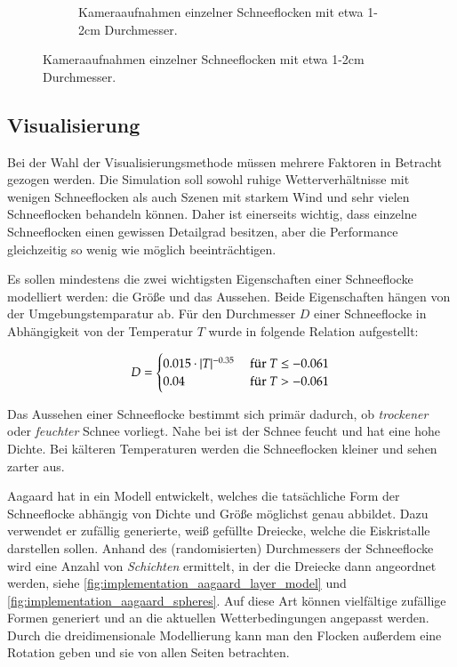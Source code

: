 \begin{figure}
\begin{subfigure}[b]{0.5\textwidth}
            \caption{Kameraaufnahmen einzelner Schneeflocken mit etwa 1-2cm Durchmesser\cite{Hanesch1966}.}
            \label{fig:implementation_real_snowflakes}
    \end{subfigure}
\end{figure}

\subsection{Visualisierung}

Bei der Wahl der Visualisierungsmethode müssen mehrere Faktoren in
Betracht gezogen werden. Die Simulation soll sowohl ruhige
Wetterverhältnisse mit wenigen Schneeflocken als auch Szenen mit
starkem Wind und sehr vielen Schneeflocken behandeln können. Daher ist
einerseits wichtig, dass einzelne Schneeflocken einen gewissen
Detailgrad besitzen, aber die Performance gleichzeitig so wenig wie
möglich beeinträchtigen.

Es sollen mindestens die zwei wichtigsten Eigenschaften einer
Schneeflocke modelliert werden: die Größe und das Aussehen. Beide
Eigenschaften hängen von der Umgebungstemparatur ab. Für den Durchmesser $D$
einer Schneeflocke in Abhängigkeit von der Temperatur $T$ wurde in
\cite{Jun00} folgende Relation aufgestellt:

\begin{equation}
D =
\begin{cases}
0.015 \cdot |T|^{-0.35} & \textnormal{ für }T \leq -0.061 \\
0.04 & \textnormal{ für }T > -0.061
\end{cases}
\end{equation}

Das Aussehen einer Schneeflocke bestimmt sich primär dadurch, ob
\emph{trockener} oder \emph{feuchter} Schnee vorliegt. Nahe bei
 ist der Schnee feucht und hat eine hohe
Dichte. Bei kälteren Temperaturen werden die Schneeflocken kleiner und
sehen zarter aus.

Aagaard hat in \cite{Aagaard2004} ein Modell entwickelt, welches die
tatsächliche Form der Schneeflocke abhängig von Dichte und Größe
möglichst genau abbildet. Dazu verwendet er zufällig generierte, weiß
gefüllte Dreiecke, welche die Eiskristalle darstellen sollen. Anhand
des (randomisierten) Durchmessers der Schneeflocke wird eine Anzahl
von \emph{Schichten} ermittelt, in der die Dreiecke dann angeordnet werden,
siehe \autoref{fig:implementation_aagaard_layer_model} und
\autoref{fig:implementation_aagaard_spheres}. Auf diese Art können
vielfältige zufällige Formen generiert und an die aktuellen
Wetterbedingungen angepasst werden. Durch die dreidimensionale
Modellierung kann man den Flocken außerdem eine Rotation geben und sie
von allen Seiten betrachten.

